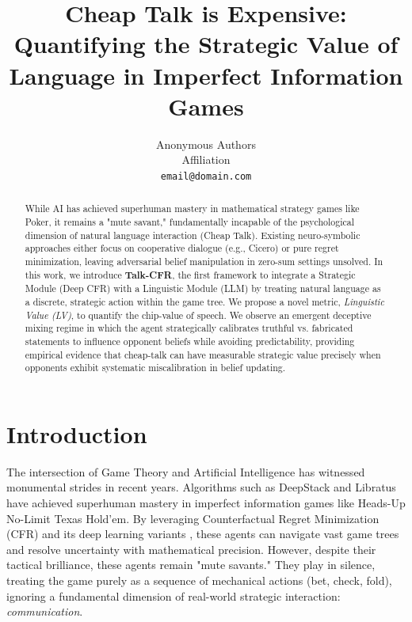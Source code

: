 \documentclass{article}
\title{Cheap Talk is Expensive: Quantifying the Strategic Value of Language in Imperfect Information Games}
\author{%
  Anonymous Authors \\
  Affiliation \\
  \texttt{email@domain.com} \\
}
\date{}
\begin{document}
\maketitle

\begin{abstract}
While AI has achieved superhuman mastery in mathematical strategy games like Poker, it remains a "mute savant," fundamentally incapable of the psychological dimension of natural language interaction (Cheap Talk). Existing neuro-symbolic approaches either focus on cooperative dialogue (e.g., Cicero) or pure regret minimization, leaving adversarial belief manipulation in zero-sum settings unsolved. In this work, we introduce \textbf{Talk-CFR}, the first framework to integrate a Strategic Module (Deep CFR) with a Linguistic Module (LLM) by treating natural language as a discrete, strategic action within the game tree. We propose a novel metric, \emph{Linguistic Value (LV)}, to quantify the chip-value of speech. We observe an emergent deceptive mixing regime in which the agent strategically calibrates truthful vs. fabricated statements to influence opponent beliefs while avoiding predictability, providing empirical evidence that cheap-talk can have measurable strategic value precisely when opponents exhibit systematic miscalibration in belief updating.
\end{abstract}

\section{Introduction}
The intersection of Game Theory and Artificial Intelligence has witnessed monumental strides in recent years. Algorithms such as DeepStack \citep{moravcik2017deepstack} and Libratus \citep{brown2018superhuman} have achieved superhuman mastery in imperfect information games like Heads-Up No-Limit Texas Hold'em. By leveraging Counterfactual Regret Minimization (CFR) and its deep learning variants \citep{brown2019deep}, these agents can navigate vast game trees and resolve uncertainty with mathematical precision. However, despite their tactical brilliance, these agents remain "mute savants." They play in silence, treating the game purely as a sequence of mechanical actions (bet, check, fold), ignoring a fundamental dimension of real-world strategic interaction: \textit{communication}.
\end{document}
